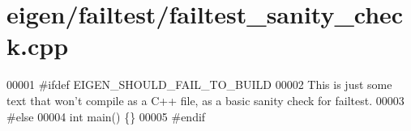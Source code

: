 \hypertarget{eigen_2failtest_2failtest__sanity__check_8cpp_source}{}\section{eigen/failtest/failtest\+\_\+sanity\+\_\+check.cpp}
\label{eigen_2failtest_2failtest__sanity__check_8cpp_source}

\begin{DoxyCode}
00001 \textcolor{preprocessor}{#ifdef EIGEN\_SHOULD\_FAIL\_TO\_BUILD}
00002 This is just some text that won\textcolor{stringliteral}{'t compile as a C++ file, as a basic sanity check for failtest.}
00003 \textcolor{stringliteral}{#else}
00004 \textcolor{stringliteral}{int main() \{\}}
00005 \textcolor{stringliteral}{#endif}
\end{DoxyCode}
